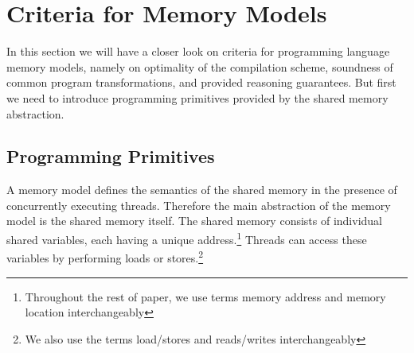 \section{Criteria for Memory Models}
\label{sec:background}

In this section we will have a closer look on criteria for 
programming language memory models, 
namely on optimality of the compilation scheme, 
soundness of common program transformations, 
and provided reasoning guarantees.  
But first we need to introduce  
programming primitives provided 
by the shared memory abstraction. 

\subsection{Programming Primitives}
\label{sec:background:primitives}


A memory model defines the semantics of the shared memory 
in the presence of concurrently executing threads. 
Therefore the main abstraction of the memory model 
is the shared memory itself. 
The shared memory consists of individual shared variables, 
each having a unique address.\footnote{
Throughout the rest of paper, we use terms 
memory address and memory location interchangeably}
Threads can access these variables by performing 
loads or stores.\footnote{We also use the terms 
load/stores and reads/writes interchangeably}

